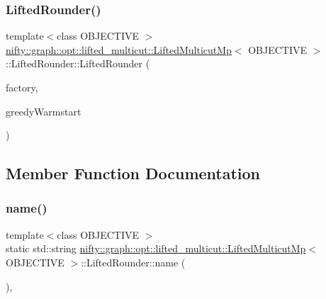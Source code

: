\subsubsection{\texorpdfstring{Lifted\+Rounder()}{LiftedRounder()}}
{\footnotesize\ttfamily template$<$class O\+B\+J\+E\+C\+T\+I\+VE $>$ \\
\hyperlink{classnifty_1_1graph_1_1opt_1_1lifted__multicut_1_1LiftedMulticutMp}{nifty\+::graph\+::opt\+::lifted\+\_\+multicut\+::\+Lifted\+Multicut\+Mp}$<$ O\+B\+J\+E\+C\+T\+I\+VE $>$\+::Lifted\+Rounder\+::\+Lifted\+Rounder (\begin{DoxyParamCaption}\item[{std\+::shared\+\_\+ptr$<$ \hyperlink{structnifty_1_1graph_1_1opt_1_1lifted__multicut_1_1LiftedMulticutMp_1_1LiftedRounder_a0b0e44f6ebf431a6776874d27243c11d}{Primal\+Rounder\+Lmc\+Factory\+Base} $>$}]{factory,  }\item[{const bool}]{greedy\+Warmstart }\end{DoxyParamCaption})\hspace{0.3cm}{\ttfamily [inline]}}



\subsection{Member Function Documentation}
\mbox{\label{structnifty_1_1graph_1_1opt_1_1lifted__multicut_1_1LiftedMulticutMp_1_1LiftedRounder_a1289836f2e3664ef5a186cfefa1b5909}} 
\subsubsection{\texorpdfstring{name()}{name()}}
{\footnotesize\ttfamily template$<$class O\+B\+J\+E\+C\+T\+I\+VE $>$ \\
static std\+::string \hyperlink{classnifty_1_1graph_1_1opt_1_1lifted__multicut_1_1LiftedMulticutMp}{nifty\+::graph\+::opt\+::lifted\+\_\+multicut\+::\+Lifted\+Multicut\+Mp}$<$ O\+B\+J\+E\+C\+T\+I\+VE $>$\+::Lifted\+Rounder\+::name (\begin{DoxyParamCaption}{ }\end{DoxyParamCaption})\hspace{0.3cm}{\ttfamily [inline]}, {\ttfamily [static]}}

